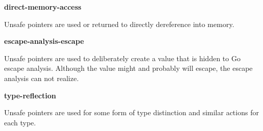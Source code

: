 


\textbf{direct-memory-access}

Unsafe pointers are used or returned to directly dereference into memory.




\textbf{escape-analysis-escape}

Unsafe pointers are used to deliberately create a value that is hidden to Go escape analysis.
Although the value might and probably will escape, the escape analysis can not realize.




\textbf{type-reflection}

Unsafe pointers are used for some form of type distinction and similar actions for each type.




